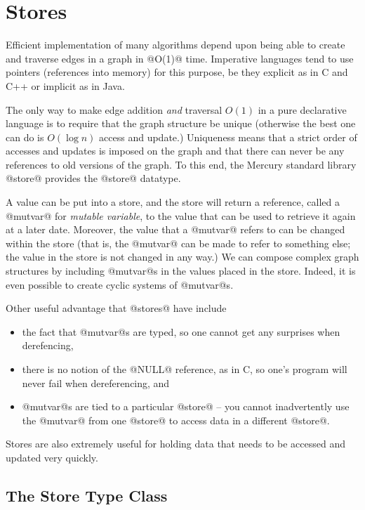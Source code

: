 
\chapter{Stores}

Efficient implementation of many algorithms depend upon being able to
create and traverse edges in a graph in @O(1)@ time.  Imperative
languages tend to use pointers (references into memory) for this
purpose, be they explicit as in C and C++ or implicit as in Java.

The only way to make edge addition \emph{and} traversal $O(1)$ in a pure
declarative language is to require that the graph structure be unique
(otherwise the best one can do is $O(\log n)$ access and update.)
Uniqueness means that a strict order of accesses and updates is imposed
on the graph and that there can never be any references to old versions
of the graph.  To this end, the Mercury standard library @store@
provides the @store@ datatype.

A value can be put into a store, and the store will return a
reference, called a @mutvar@ for \emph{mutable variable}, to the value
that can be used to retrieve it again at a later date.  Moreover, the
value that a @mutvar@ refers to can be changed within the store (that
is, the @mutvar@ can be made to refer to something else; the value in
the store is not changed in any way.)  We can compose complex graph
structures by including @mutvar@s in the values placed in the store.
Indeed, it is even possible to create cyclic systems of @mutvar@s.

Other useful advantage that @stores@ have include
\begin{itemize}
\item the fact that @mutvar@s are typed, so one cannot get any
surprises when derefencing,
\item there is no notion of the @NULL@ reference, as in C, so one's
program will never fail when dereferencing, and
\item @mutvar@s are tied to a particular @store@ -- you cannot
inadvertently use the @mutvar@ from one @store@ to access data in a
different @store@.
\end{itemize}

Stores are also extremely useful for holding data that needs to be
accessed and updated very quickly.

\section{The Store Type Class}

